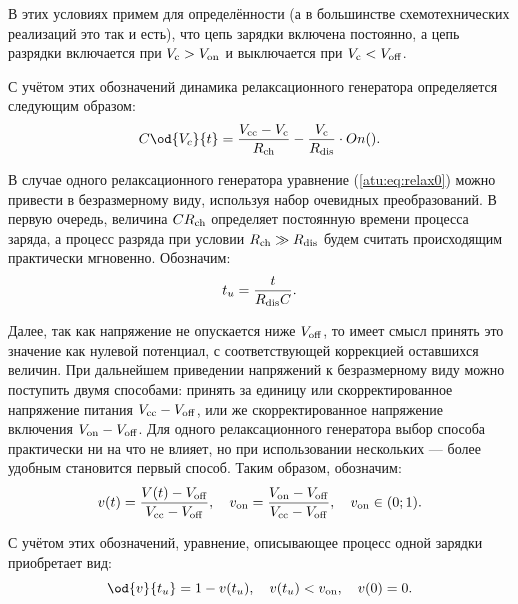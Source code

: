 
В этих условиях примем для определённости
(а в большинстве схемотехнических реализаций это так и есть),
что цепь зарядки включена постоянно, а цепь разрядки
включается при $V_\mathrm{c} > V_\mathrm{on} $ и выключается при
$V_\mathrm{c} < V_\mathrm{off}$.

С учётом этих обозначений динамика релаксационного генератора
определяется следующим образом:
%
\begin{equation}
  C \od{V_c}{t}
  =
  \frac{V\Tidx{cc} - V\Tidx{c}}{R\Tidx{ch}}
  - \frac{V\Tidx{c}}{R\Tidx{dis}} \cdot On().
  \label{atu:eq:relax0}
\end{equation}

В случае одного релаксационного генератора
уравнение (\ref{atu:eq:relax0}) можно привести в безразмерному виду,
используя набор очевидных преобразований. В первую
очередь, величина $C R_\mathrm{ch}$ определяет
постоянную времени процесса заряда, а процесс
разряда при условии $R_\mathrm{ch} \gg R_\mathrm{dis} $ будем считать происходящим практически мгновенно.
Обозначим:
%
\begin{equation}
  t_u = \frac{t}{R_\mathrm{dis} C} .
  \label{atu:eq:t_u_relax}
\end{equation}

Далее, так как напряжение не опускается ниже $V_\mathrm{off}$,
то имеет смысл принять это значение как нулевой потенциал, с соответствующей
коррекцией оставшихся величин. При дальнейшем приведении напряжений к безразмерному виду
можно поступить двумя способами: принять за единицу или
скорректированное напряжение питания $V_\mathrm{cc}-V_\mathrm{off}$,
или же
скорректированное напряжение включения $V_\mathrm{on}-V_\mathrm{off}$.
Для одного релаксационного генератора выбор способа практически ни
на что не влияет, но при использовании нескольких --- более удобным
становится первый способ. Таким образом, обозначим:
%
\begin{equation}
  v(t) = \frac{V(t)-V_\mathrm{off}}{V_\mathrm{cc}-V_\mathrm{off}},
  \quad
  v_\mathrm{on} = \frac{V_\mathrm{on}-V_\mathrm{off}}{V_\mathrm{cc}-V_\mathrm{off}},
  \quad
  v_\mathrm{on} \in ( 0; 1 ).
  \label{atu:eq:v_u_relax}
\end{equation}

С учётом этих обозначений, уравнение, описывающее процесс одной зарядки приобретает вид:
%
\begin{equation}
  \od{v}{t_u} = 1 - v( t_u ),
  \quad
  v( t_u ) < v\Tidx{on},
  \quad
  v(0) = 0.
  \label{atu:eq:relax_charge_u}
\end{equation}

